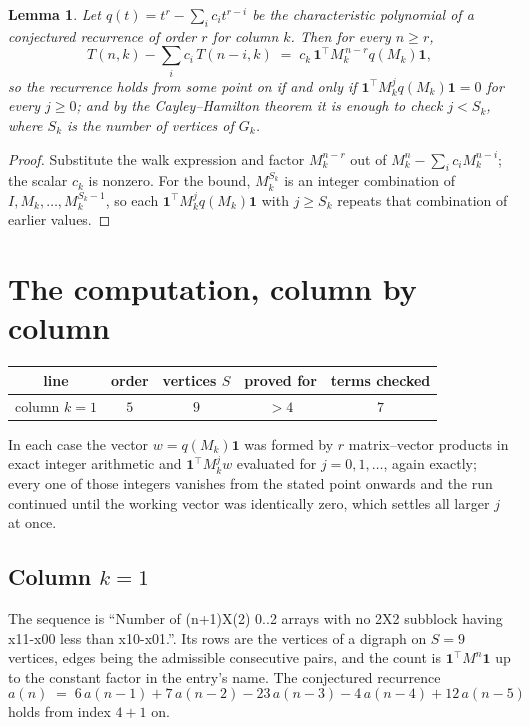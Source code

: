 \documentclass[11pt,a4paper]{article}
\theoremstyle{plain}
\newtheorem{lemma}[theorem]{Lemma}
\theoremstyle{definition}
\begin{document}
\begin{lemma}\label{lem:crit}
Let $q(t)=t^{r}-\sum_i c_it^{r-i}$ be the characteristic polynomial of a conjectured
recurrence of order $r$ for column $k$. Then for every $n\ge r$,
\[
T(n,k)-\sum_i c_i\,T(n-i,k)\;=\;c_k\,\mathbf{1}^{\!\top}M_k^{\,n-r}q(M_k)\mathbf{1},
\]
so the recurrence holds from some point on if and only if
$\mathbf{1}^{\!\top}M_k^{j}q(M_k)\mathbf{1}=0$ for every $j\ge0$; and by the
Cayley--Hamilton theorem it is enough to check $j<S_k$, where $S_k$ is the number of vertices
of $G_k$.
\end{lemma}

\begin{proof}
Substitute the walk expression and factor $M_k^{n-r}$ out of $M_k^{n}-\sum_ic_iM_k^{n-i}$;
the scalar $c_k$ is nonzero. For the bound, $M_k^{S_k}$ is an integer combination of
$I,M_k,\dots,M_k^{S_k-1}$, so each $\mathbf{1}^{\!\top}M_k^{j}q(M_k)\mathbf{1}$ with
$j\ge S_k$ repeats that combination of earlier values.
\end{proof}

\section{The computation, column by column}

\begin{center}
\begin{tabular}{ccccc}
line & order & vertices $S$ & proved for & terms checked \\ \hline
column $k$$=1$ & $5$ & $9$ & $>4$ & $7$ \\
\end{tabular}
\end{center}

In each case the vector $w=q(M_k)\mathbf{1}$ was formed by $r$ matrix--vector products in
exact integer arithmetic and $\mathbf{1}^{\!\top}M_k^{j}w$ evaluated for $j=0,1,\dots$,
again exactly; every one of those integers vanishes from the stated point onwards and the run
continued until the working vector was identically zero, which settles all larger $j$ at once.

\subsection*{Column $k$$=1$}
The sequence is ``Number of (n+1)X(2) 0..2 arrays with no 2X2 subblock having x11-x00 less than x10-x01.''. Its rows are the vertices of a digraph on
$S=9$ vertices, edges being the admissible consecutive pairs, and the count is
$\mathbf{1}^{\!\top}M^{n}\mathbf{1}$ up to the constant factor in the entry's name.
The conjectured recurrence
\[
a(n)\;=\;6\,a(n-1) + 7\,a(n-2) - 23\,a(n-3) - 4\,a(n-4) + 12\,a(n-5)
\]
holds from index $4+1$ on.
\end{document}
